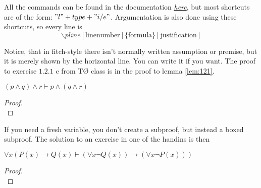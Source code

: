 \documentclass[a4, english, twoside]{article}
\begin{document}
All the commands can be found in the documentation \href{http://mirrors.dotsrc.org/ctan/macros/latex/contrib/lplfitch/lplfitch.pdf}{\emph{here}}, but most shortcuts are of the form: $"l" + type + "i/e"$. Argumentation is also done using these shortcuts, so every line is
\begin{equation*}
    \backslash pline[\text{linenumber}]\{\text{formula}\}[\text{justification}]
\end{equation*}

Notice, that in fitch-style there isn't normally written assumption or premise, but it is merely shown by the horizontal line. You can write it if you want. The proof to exercise $1.2.1$ c from TØ class is in the proof to lemma \ref{lem:121}.
\begin{lemma} \label{lem:121}
	$(p \wedge q) \wedge r \vdash p \wedge (q \wedge r)$
\end{lemma}
\begin{proof}
	 \\ %
\end{proof}

If you need a fresh variable, you don't create a subproof, but instead a boxed subproof. The solution to an exercise in one of the handins is then
\begin{theorem} \label{theo:handin}
	$\forall x (P(x) \rightarrow Q(x) \vdash (\forall x \neg Q(x)) \rightarrow (\forall x \neg P(x)))$
\end{theorem}
\begin{proof}
	 \\ %
\end{proof}
\end{document}

